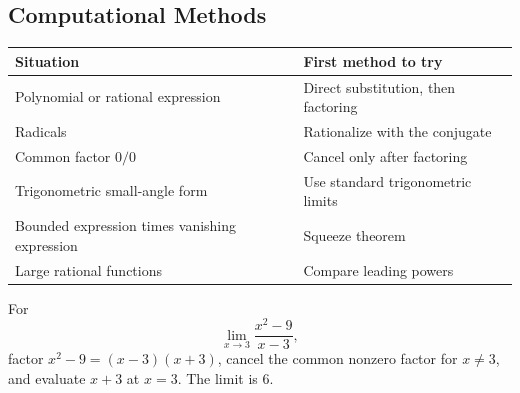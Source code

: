 \subsection*{Computational Methods}

\begin{center}
\begin{tabular}{ll}
\toprule
Situation & First method to try \\
\midrule
Polynomial or rational expression & Direct substitution, then factoring \\
Radicals & Rationalize with the conjugate \\
Common factor \(0/0\) & Cancel only after factoring \\
Trigonometric small-angle form & Use standard trigonometric limits \\
Bounded expression times vanishing expression & Squeeze theorem \\
Large rational functions & Compare leading powers \\
\bottomrule
\end{tabular}
\end{center}

\begin{example*}
For
\[
  \lim_{x\to 3}\frac{x^2-9}{x-3},
\]
factor \(x^2-9=(x-3)(x+3)\), cancel the common nonzero factor for
\(x\neq 3\), and evaluate \(x+3\) at \(x=3\). The limit is \(6\).
\end{example*}
